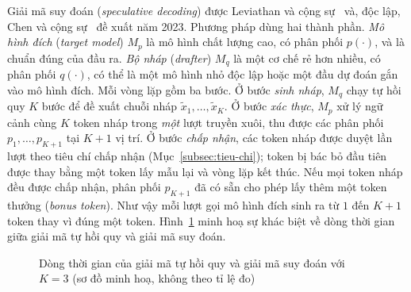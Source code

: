 Giải mã suy đoán (\textit{speculative decoding}) được Leviathan và cộng sự~\cite{leviathan2023speculative} và, độc lập, Chen và cộng sự~\cite{chen2023speculative} đề xuất năm 2023. Phương pháp dùng hai thành phần. \textit{Mô hình đích} (\textit{target model}) $M_p$ là mô hình chất lượng cao, có phân phối $p(\cdot)$, và là chuẩn đúng của đầu ra. \textit{Bộ nháp} (\textit{drafter}) $M_q$ là một cơ chế rẻ hơn nhiều, có phân phối $q(\cdot)$, có thể là một mô hình nhỏ độc lập hoặc một đầu dự đoán gắn vào mô hình đích. Mỗi vòng lặp gồm ba bước. Ở bước \textit{sinh nháp}, $M_q$ chạy tự hồi quy $K$ bước để đề xuất chuỗi nháp $\tilde{x}_1,\dots,\tilde{x}_K$. Ở bước \textit{xác thực}, $M_p$ xử lý ngữ cảnh cùng $K$ token nháp trong \emph{một} lượt truyền xuôi, thu được các phân phối $p_1,\dots,p_{K+1}$ tại $K+1$ vị trí. Ở bước \textit{chấp nhận}, các token nháp được duyệt lần lượt theo tiêu chí chấp nhận (Mục~\ref{subsec:tieu-chi}); token bị bác bỏ đầu tiên được thay bằng một token lấy mẫu lại và vòng lặp kết thúc. Nếu mọi token nháp đều được chấp nhận, phân phối $p_{K+1}$ đã có sẵn cho phép lấy thêm một token thưởng (\textit{bonus token}). Như vậy mỗi lượt gọi mô hình đích sinh ra từ $1$ đến $K+1$ token thay vì đúng một token. Hình~\ref{fig:sd-timeline} minh hoạ sự khác biệt về dòng thời gian giữa giải mã tự hồi quy và giải mã suy đoán.

\begin{figure}[htbp]
\centering
{}
\caption{Dòng thời gian của giải mã tự hồi quy và giải mã suy đoán với $K=3$ (sơ đồ minh hoạ, không theo tỉ lệ đo)}
\label{fig:sd-timeline}
\end{figure}

